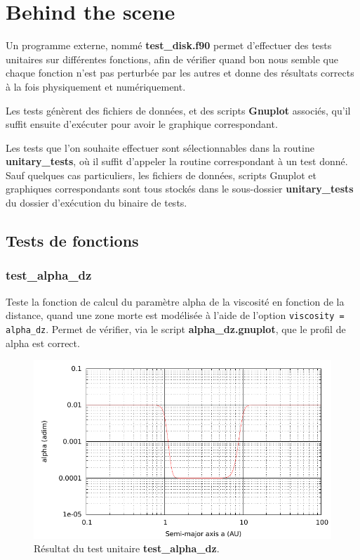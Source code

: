 \section{Behind the scene}\label{sec:unitary_tests}
Un programme externe, nommé \textbf{test\_disk.f90} permet d'effectuer des tests unitaires sur différentes fonctions, afin de vérifier quand bon nous semble que chaque fonction n'est pas perturbée par les autres et donne des résultats corrects à la fois physiquement et numériquement.

Les tests génèrent des fichiers de données, et des scripts \textbf{Gnuplot} associés, qu'il suffit ensuite d'exécuter pour avoir le graphique correspondant. 

Les tests que l'on souhaite effectuer sont sélectionnables dans la routine \textbf{unitary\_tests}, où il suffit d'appeler la routine correspondant à un test donné. Sauf quelques cas particuliers, les fichiers de données, scripts Gnuplot et graphiques correspondants sont tous stockés dans le sous-dossier \textbf{unitary\_tests} du dossier d'exécution du binaire de tests.

\subsection{Tests de fonctions}
\subsubsection{test\_alpha\_dz}
Teste la fonction de calcul du paramètre alpha de la viscosité en fonction de la distance, quand une zone morte est modélisée à l'aide de l'option \verb|viscosity = alpha_dz|. Permet de vérifier, via le script \textbf{alpha\_dz.gnuplot}, que le profil de alpha est correct.


\begin{figure}[htbp]
\centering
\includegraphics[width=0.65\linewidth]{figure/unitary_tests/alpha_dz.pdf}
\caption{Résultat du test unitaire \textbf{test\_alpha\_dz}.}
\end{figure}

